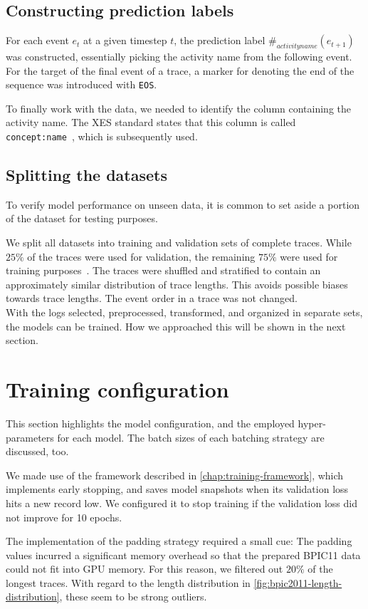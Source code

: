 \subsection*{Constructing prediction labels}
For each event $e_t$ at a given timestep $t$, the prediction label $\#_{activity name}(e_{t+1})$ was constructed, essentially picking the activity name from the following event. For the target of the final event of a trace, a marker for denoting the end of the sequence was introduced with \verb=EOS=.

To finally work with the data, we needed to identify the column containing the activity name.
The XES standard states that this column is called \verb=concept:name=~\cite{Aalst2016}, which is subsequently used.

\subsection*{Splitting the datasets}
To verify model performance on unseen data, it is common to set aside a portion of the dataset for testing purposes.

We split all datasets into training and validation sets of complete traces. While $25\%$ of the traces were used for validation, the remaining $75\%$ were used for training purposes~\cite{kuhn2013applied}. The traces were shuffled and stratified to contain an approximately similar distribution of trace lengths. This avoids possible biases towards trace lengths. The event order in a trace was not changed.\\

With the logs selected, preprocessed, transformed, and organized in separate sets, the models can be trained. How we approached this will be shown in the next section.

\section{Training configuration}\label{sec:method:test-setup}
This section highlights the model configuration, and the employed hyper-parameters for each model.
The batch sizes of each batching strategy are discussed, too.

We made use of the framework described in \autoref{chap:training-framework}, which implements early stopping, and saves model snapshots when its validation loss hits a new record low. We configured it to stop training if the validation loss did not improve for 10 epochs.

The implementation of the padding strategy required a small cue: The padding values incurred a significant memory overhead so that the prepared BPIC11 data could not fit into GPU memory. For this reason, we filtered out $20\%$ of the longest traces. With regard to the length distribution in \autoref{fig:bpic2011-length-distribution}, these seem to be strong outliers.

